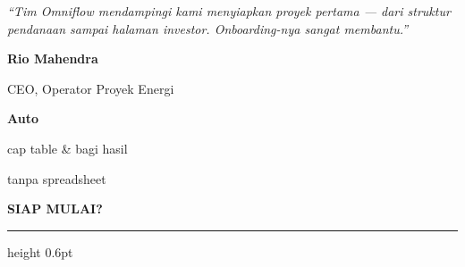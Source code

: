 \documentclass[a4paper]{article}
\newcommand{\sectiontitle}[1]{%
    \vspace{10pt}%
    {\fontsize{13}{16}\selectfont\bfseries\color{BlueDark} #1}\par\vspace{3pt}%
    {\color{BluePrimary}\hrule height 0.6pt}\par\vspace{8pt}%
}
\begin{document}
\noindent
\begin{minipage}[t]{0.485\textwidth}
    \colorbox{BlueBg}{%
        \begin{minipage}{\dimexpr\linewidth-2\fboxsep\relax}
            {\fontsize{9.5}{13}\selectfont\color{TextDark}\textit{``Tim Omniflow mendampingi kami menyiapkan proyek pertama --- dari struktur pendanaan sampai halaman investor. Onboarding-nya sangat membantu.''}}\par\vspace{4pt}
            {\fontsize{8.5}{11}\selectfont\bfseries\color{BluePrimary} Rio Mahendra}\par
            {\fontsize{8}{10}\selectfont\color{TextLight} CEO, Operator Proyek Energi}
        \end{minipage}}
\end{minipage}%
\hfill
\begin{minipage}[t]{0.485\textwidth}
    \colorbox{BlueBg}{%
        \begin{minipage}{\dimexpr\linewidth-2\fboxsep\relax}
            \begin{center}
                {\fontsize{20}{24}\selectfont\bfseries\color{BluePrimary} Auto}\par
                {\fontsize{9.5}{12}\selectfont\color{TextDark} cap table \& bagi hasil}\par
                {\fontsize{9.5}{12}\selectfont\color{TextDark} tanpa spreadsheet}
            \end{center}
        \end{minipage}}
\end{minipage}

\sectiontitle{SIAP MULAI?}
\end{document}
